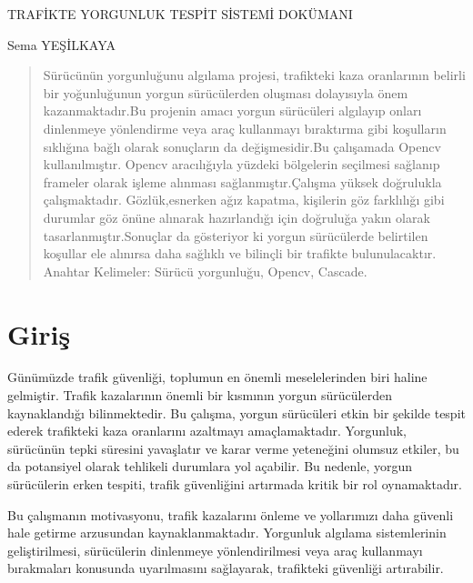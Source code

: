 \documentclass[12pt, a4paper]{article}
\begin{document}
	\begin{titlepage}
		\centering
		{\LARGE TRAFİKTE YORGUNLUK TESPİT SİSTEMİ DOKÜMANI \par}
		\vspace{1cm}
		{\Large Sema YEŞİLKAYA \par}
		\vspace{1.5cm}
		\begin{abstract}
			
			Sürücünün yorgunluğunu algılama projesi, trafikteki kaza oranlarının belirli bir yoğunluğunun yorgun sürücülerden oluşması dolayısıyla önem kazanmaktadır.Bu projenin amacı yorgun sürücüleri algılayıp onları dinlenmeye yönlendirme veya araç kullanmayı bıraktırma gibi koşulların sıklığına bağlı olarak sonuçların da değişmesidir.\newline Bu çalışamada Opencv kullanılmıştır. Opencv aracılığıyla yüzdeki bölgelerin seçilmesi sağlanıp frameler olarak işleme alınması sağlanmıştır.Çalışma yüksek doğrulukla çalışmaktadır. Gözlük,esnerken ağız kapatma, kişilerin göz farklılığı gibi durumlar göz önüne alınarak hazırlandığı için doğruluğa yakın olarak tasarlanmıştır.Sonuçlar da gösteriyor ki yorgun sürücülerde belirtilen koşullar ele alınırsa daha sağlıklı ve bilinçli bir trafikte bulunulacaktır. \newline
			Anahtar Kelimeler: Sürücü yorgunluğu, Opencv, Cascade.
		\end{abstract}
		\vfill
	\end{titlepage}
	
	\tableofcontents
	\newpage
	
	\section{Giriş}
	Günümüzde trafik güvenliği, toplumun en önemli meselelerinden biri haline gelmiştir. Trafik kazalarının önemli bir kısmının yorgun sürücülerden kaynaklandığı bilinmektedir. Bu çalışma, yorgun sürücüleri etkin bir şekilde tespit ederek trafikteki kaza oranlarını azaltmayı amaçlamaktadır. Yorgunluk, sürücünün tepki süresini yavaşlatır ve karar verme yeteneğini olumsuz etkiler, bu da potansiyel olarak tehlikeli durumlara yol açabilir. Bu nedenle, yorgun sürücülerin erken tespiti, trafik güvenliğini artırmada kritik bir rol oynamaktadır.
	
	Bu çalışmanın motivasyonu, trafik kazalarını önleme ve yollarımızı daha güvenli hale getirme arzusundan kaynaklanmaktadır. Yorgunluk algılama sistemlerinin geliştirilmesi, sürücülerin dinlenmeye yönlendirilmesi veya araç kullanmayı bırakmaları konusunda \newline uyarılmasını sağlayarak, trafikteki güvenliği artırabilir.
	
\end{document}
